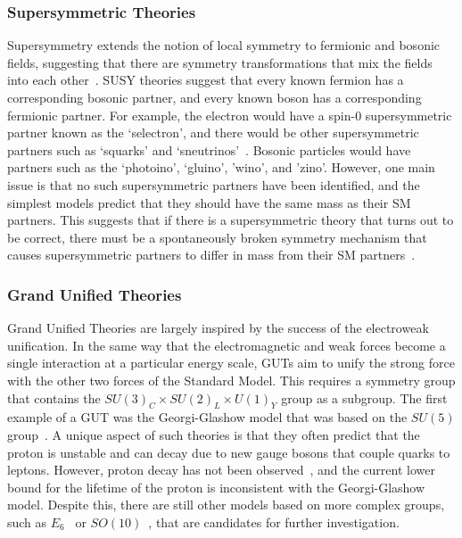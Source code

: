 \subsubsection{Supersymmetric Theories}

Supersymmetry extends the notion of local symmetry to fermionic and bosonic fields, suggesting that there are symmetry transformations that mix the fields into each other~\cite{Wess197452}.
SUSY theories suggest that every known fermion has a corresponding bosonic partner, and every known boson has a corresponding fermionic partner.
For example, the electron would have a spin-0 supersymmetric partner known as the `selectron', and there would be other supersymmetric partners such as `squarks' and `sneutrinos'~\cite{Martin_1998}.
Bosonic particles would have partners such as the `photoino', `gluino', 'wino', and 'zino'.
However, one main issue is that no such supersymmetric partners have been identified, and the simplest models predict that they should have the same mass as their SM partners.
This suggests that if there is a supersymmetric theory that turns out to be correct, there must be a spontaneously broken symmetry mechanism that causes supersymmetric partners to differ in mass from their SM partners~\cite{dine_2007}.

\subsubsection{Grand Unified Theories}

Grand Unified Theories are largely inspired by the success of the electroweak unification.
In the same way that the electromagnetic and weak forces become a single interaction at a particular energy scale, GUTs aim to unify the strong force with the other two forces of the Standard Model.
This requires a symmetry group that contains the $SU(3)_C\times SU(2)_L\times U(1)_Y$ group as a subgroup.
The first example of a GUT was the Georgi-Glashow model that was based on the $SU(5)$ group~\cite{PhysRevLett.32.438}.
A unique aspect of such theories is that they often predict that the proton is unstable and can decay due to new gauge bosons that couple quarks to leptons\footnotemark.
However, proton decay has not been observed~\cite{PhysRevLett.81.3319}, and the current lower bound for the lifetime of the proton is inconsistent with the Georgi-Glashow model.
Despite this, there are still other models based on more complex groups, such as $E_6$~\cite{Hewett1989193} or $SO(10)$~\cite{Cveti__1997}, that are candidates for further investigation.

